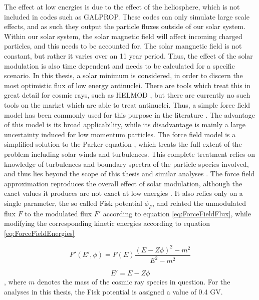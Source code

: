 The effect at low energies is due to the effect of the heliosphere, which is not included in codes such as GALPROP. These codes can only simulate large scale effects, and as such they output the particle fluxes outside of our solar system. Within our solar system, the solar magnetic field will affect incoming charged particles, and this needs to be accounted for. The solar mangnetic field is not constant, but rather it varies over an 11 year period\cite{}. Thus, the effect of the solar modulation is also time dependent and needs to be calculated for a specific scenario. In this thesis, a solar minimum is considered, in order to discern the most optimistic flux of low energy antinuclei. There are tools which treat this in great detail for cosmic rays, such as HELMOD \cite{}, but there are currently no such tools on the market which are able to treat antinuclei. Thus, a simple force field model has been commonly used for this purpose in the literature \cite{}. The advantage of this model is its broad applicability, while its disadvantage is mainly a large uncertainty induced for low momentum particles\cite{}. The force field model is a simplified solution to the Parker equation \cite{29 from CR AN}, which treats the full extent of the problem including solar winds and turbulences. This complete treatment relies on knowledge of turbulences and boundary spectra of the particle species involved, and thus lies beyond the scope of this thesis and similar analyses \cite{Korseier 2018, Ibarra, Boschini:2018baj}. The force field approximation reproduces the overall effect of solar modulation, although the exact values it produces are not exact at low energies \cite{}. It also relies only on a single parameter, the so called Fisk potential $\phi_F$, and related the unmodulated flux $F$ to the modulated flux $F'$ according to equation \ref{eq:ForceFieldFlux}, while modifying the corresponding kinetic energies according to equation \ref{eq:ForceFieldEnergies}

\begin{equation}
    \label{eq:ForceFieldFlux}
    F' (E', \phi) = F(E) \frac{(E-Z\phi)^2 - m^2}{E^2-m^2}
\end{equation}

\begin{equation}
    \label{eq:ForceFieldEnergies}
    E' = E-Z\phi
\end{equation}
, where $m$ denotes the mass of the cosmic ray species in question. For the analyses in this thesis, the Fisk potential is assigned a value of 0.4 GV. \\

